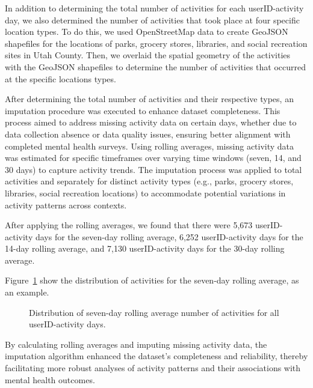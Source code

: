 \documentclass[
  letterpaper,
  number,
  review,
  3p]{elsarticle}
\begin{document}
In addition to determining the total number of activities for each
userID-activity day, we also determined the number of activities that
took place at four specific location types. To do this, we used
OpenStreetMap data to create GeoJSON shapefiles for the locations of
parks, grocery stores, libraries, and social recreation sites in Utah
County. Then, we overlaid the spatial geometry of the activities with
the GeoJSON shapefiles to determine the number of activities that
occurred at the specific locations types.

After determining the total number of activities and their respective
types, an imputation procedure was executed to enhance dataset
completeness. This process aimed to address missing activity data on
certain days, whether due to data collection absence or data quality
issues, ensuring better alignment with completed mental health surveys.
Using rolling averages, missing activity data was estimated for specific
timeframes over varying time windows (seven, 14, and 30 days) to capture
activity trends. The imputation process was applied to total activities
and separately for distinct activity types (e.g., parks, grocery stores,
libraries, social recreation locations) to accommodate potential
variations in activity patterns across contexts.

After applying the rolling averages, we found that there were 5,673
userID-activity days for the seven-day rolling average, 6,252
userID-activity days for the 14-day rolling average, and 7,130
userID-activity days for the 30-day rolling average.

Figure~\ref{fig-numActsev} show the distribution of activities for the
seven-day rolling average, as an example.

\begin{figure}[H]


\caption{\label{fig-numActsev}Distribution of seven-day rolling average
number of activities for all userID-activity days.}

\end{figure}%

By calculating rolling averages and imputing missing activity data, the
imputation algorithm enhanced the dataset's completeness and
reliability, thereby facilitating more robust analyses of activity
patterns and their associations with mental health outcomes.
\end{document}
